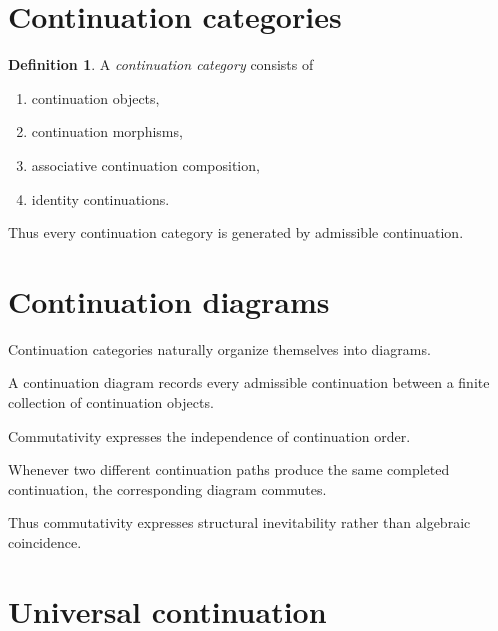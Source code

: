 \documentclass[13pt,openany]{book}
\theoremstyle{plain}
\theoremstyle{definition}
\newtheorem{definition}{Definition}[chapter]
\begin{document}
\section{Continuation categories}

\begin{definition}

A \emph{continuation category} consists of

\begin{enumerate}

\item continuation objects,

\item continuation morphisms,

\item associative continuation composition,

\item identity continuations.

\end{enumerate}

\end{definition}

Thus every continuation category is generated by admissible continuation.

\section{Continuation diagrams}

Continuation categories naturally organize themselves into diagrams.

A continuation diagram records every admissible continuation between a finite
collection of continuation objects.

Commutativity expresses the independence of continuation order.

Whenever two different continuation paths produce the same completed
continuation, the corresponding diagram commutes.

Thus commutativity expresses structural inevitability rather than algebraic
coincidence.

\section{Universal continuation}
\end{document}
